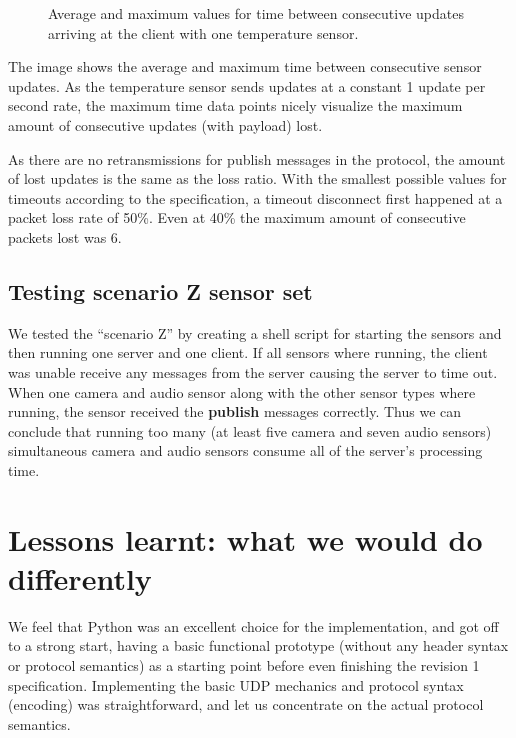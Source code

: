 \documentclass[a4paper]{article}
\begin{document}
\begin{figure}[h!]
\caption{Average and maximum values for time between consecutive updates arriving at the client with one temperature sensor.} \label{fig:lossdata}
\end{figure}

The image shows the average and maximum time between consecutive sensor updates.
As the temperature sensor sends updates at a constant 1 update per second rate,
the maximum time data points nicely visualize the maximum amount of consecutive
updates (with payload) lost.

As there are no retransmissions for publish messages in the protocol, the amount
of lost updates is the same as the loss ratio. With the smallest possible values
for timeouts according to the specification, a timeout disconnect first happened
at a packet loss rate of 50\%. Even at 40\% the maximum amount of consecutive
packets lost was 6.

\subsection{Testing scenario Z sensor set}
We tested the ``scenario Z'' by creating a shell script
for starting the sensors and then running one server and one client. If all
sensors where running, the client was unable receive any messages from the
server causing the server to time out. When one camera and audio sensor along
with the other sensor types where running, the sensor received the \textbf{publish}
messages correctly. Thus we can conclude that running too many (at least five
camera and seven audio sensors) simultaneous camera and audio sensors consume
all of the server's processing time.

\section{Lessons learnt: what we would do differently}

We feel that Python was an excellent choice for the implementation, and got off to a strong start, having a basic functional prototype (without any header syntax or protocol semantics) as a starting point before even finishing the revision 1 specification.
Implementing the basic UDP mechanics and protocol syntax (encoding) was straightforward, and let us concentrate on the actual protocol semantics.
\end{document}
